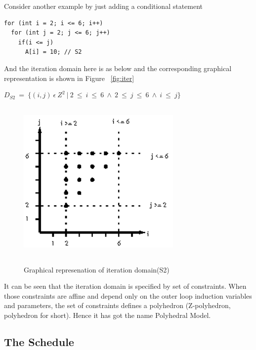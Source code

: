 Consider another example by just adding a conditional statement
{\footnotesize
\begin{lstlisting}
for (int i = 2; i <= 6; i++)
  for (int j = 2; j <= 6; j++)
    if(i <= j)
      A[i] = 10; // S2
\end{lstlisting}
}
And the iteration domain here is as below and the corresponding graphical representation is shown in Figure ~\ref{fig:iter}

\begin{center}
$D_{S2}\ =\ \{(i,j)\ \epsilon\ Z^2\ |\ 2\ \leq\ i\ \leq\ 6\ \wedge\ 2\ \leq\ j\ \leq\ 6\ \wedge\ i\ \leq\ j\}$
\end{center}
\begin{figure}
\begin{center}
  \label{fig:iter1}
  \includegraphics[height=8cm,width=8cm]{images/iter1.eps}
  \caption{Graphical represenation of iteration domain(S2)}
\end{center}  
\end{figure}

It can be seen that the iteration domain is specified by set of constraints. When those constraints are
affine and depend only on the outer loop induction variables and parameters, the set of constraints
defines a polyhedron (Z-polyhedron, polyhedron for short). Hence it has got the name Polyhedral Model.

\subsection{The Schedule}

